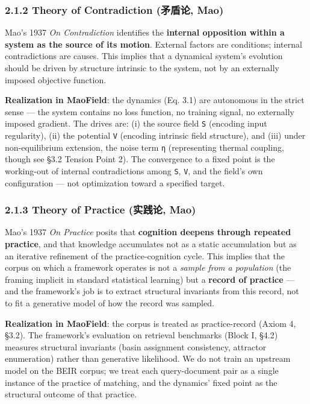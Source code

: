 \documentclass[
]{article}
\begin{document}
\hypertarget{theory-of-contradiction-ux77dbux76feux8bba-mao}{%
\subsubsection{2.1.2 Theory of Contradiction (矛盾论,
Mao)}\label{theory-of-contradiction-ux77dbux76feux8bba-mao}}

Mao's 1937 \emph{On Contradiction} identifies the \textbf{internal
opposition within a system as the source of its motion}. External
factors are conditions; internal contradictions are causes. This implies
that a dynamical system's evolution should be driven by structure
intrinsic to the system, not by an externally imposed objective
function.

\textbf{Realization in MaoField}: the dynamics (Eq. 3.1) are autonomous
in the strict sense --- the system contains no loss function, no
training signal, no externally imposed gradient. The drives are: (i) the
source field \texttt{S} (encoding input regularity), (ii) the potential
\texttt{V} (encoding intrinsic field structure), and (iii) under
non-equilibrium extension, the noise term \texttt{η} (representing
thermal coupling, though see §3.2 Tension Point 2). The convergence to a
fixed point is the working-out of internal contradictions among
\texttt{S}, \texttt{V}, and the field's own configuration --- not
optimization toward a specified target.

\hypertarget{theory-of-practice-ux5b9eux8df5ux8bba-mao}{%
\subsubsection{2.1.3 Theory of Practice (实践论,
Mao)}\label{theory-of-practice-ux5b9eux8df5ux8bba-mao}}

Mao's 1937 \emph{On Practice} posits that \textbf{cognition deepens
through repeated practice}, and that knowledge accumulates not as a
static accumulation but as an iterative refinement of the
practice-cognition cycle. This implies that the corpus on which a
framework operates is not a \emph{sample from a population} (the framing
implicit in standard statistical learning) but a \textbf{record of
practice} --- and the framework's job is to extract structural
invariants from this record, not to fit a generative model of how the
record was sampled.

\textbf{Realization in MaoField}: the corpus is treated as
practice-record (Axiom 4, §3.2). The framework's evaluation on retrieval
benchmarks (Block I, §4.2) measures structural invariants (basin
assignment consistency, attractor enumeration) rather than generative
likelihood. We do not train an upstream model on the BEIR corpus; we
treat each query-document pair as a single instance of the practice of
matching, and the dynamics' fixed point as the structural outcome of
that practice.
\end{document}
